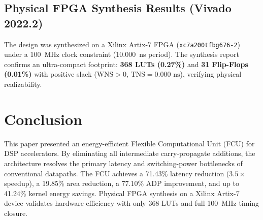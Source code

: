 \documentclass[conference]{IEEEtran}
\begin{document}
\subsection{Physical FPGA Synthesis Results (Vivado 2022.2)}
The design was synthesized on a Xilinx Artix-7 FPGA (\texttt{xc7a200tfbg676-2}) under a 100~MHz clock constraint (10.000~ns period). The synthesis report confirms an ultra-compact footprint: \textbf{368 LUTs (0.27\%)} and \textbf{31 Flip-Flops (0.01\%)} with positive slack ($\text{WNS} > 0$, $\text{TNS} = 0.000\text{ ns}$), verifying physical realizability.

\section{Conclusion}
This paper presented an energy-efficient Flexible Computational Unit (FCU) for DSP accelerators. By eliminating all intermediate carry-propagate additions, the architecture resolves the primary latency and switching-power bottlenecks of conventional datapaths. The FCU achieves a 71.43\% latency reduction ($3.5\times$ speedup), a 19.85\% area reduction, a 77.10\% ADP improvement, and up to 41.24\% kernel energy savings. Physical FPGA synthesis on a Xilinx Artix-7 device validates hardware efficiency with only 368 LUTs and full 100~MHz timing closure.
\end{document}
